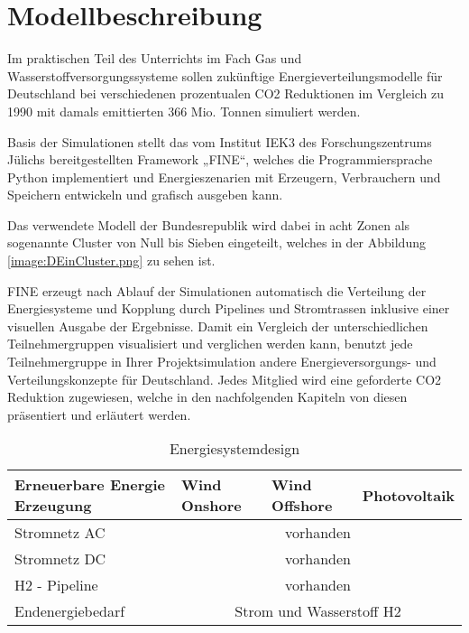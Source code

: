 \section{Modellbeschreibung}

Im praktischen Teil des Unterrichts im Fach Gas und Wasserstoffversorgungssysteme sollen zukünftige Energieverteilungsmodelle für Deutschland bei verschiedenen prozentualen CO2 Reduktionen im Vergleich zu 1990 mit damals emittierten 366 Mio. Tonnen simuliert werden. 

Basis der Simulationen stellt das vom Institut IEK3 des Forschungszentrums Jülichs bereitgestellten Framework „FINE“, welches die Programmiersprache Python implementiert und Energieszenarien mit Erzeugern, Verbrauchern und Speichern entwickeln und grafisch ausgeben kann.

Das verwendete Modell der Bundesrepublik wird dabei in acht Zonen als sogenannte Cluster von Null bis Sieben eingeteilt, welches in der Abbildung \ref{image:DEinCluster.png} zu sehen ist.


FINE erzeugt nach Ablauf der Simulationen automatisch die Verteilung der Energiesysteme und Kopplung durch Pipelines und Stromtrassen inklusive einer visuellen Ausgabe der Ergebnisse.
Damit ein Vergleich der unterschiedlichen Teilnehmergruppen visualisiert und verglichen werden kann, benutzt jede Teilnehmergruppe in Ihrer Projektsimulation andere Energieversorgungs- und Verteilungskonzepte für Deutschland. Jedes Mitglied wird eine geforderte CO2 Reduktion zugewiesen, welche in den nachfolgenden Kapiteln von diesen präsentiert und erläutert werden.%


\begin{table}[]
    \begin{tabular}{|lcll|}
        \hline
        \multicolumn{1}{|l|}{Erneuerbare Energie Erzeugung} & \multicolumn{1}{l|}{Wind Onshore} & \multicolumn{1}{l|}{Wind Offshore} & Photovoltaik \\ \hline
        \multicolumn{1}{|l|}{Stromnetz AC}     & \multicolumn{3}{c|}{vorhanden}                \\ \hline
        \multicolumn{1}{|l|}{Stromnetz DC}     & \multicolumn{3}{c|}{vorhanden}                \\ \hline
        \multicolumn{1}{|l|}{H2 - Pipeline}    & \multicolumn{3}{c|}{vorhanden}                \\ \hline
        \multicolumn{1}{|l|}{Endenergiebedarf} & \multicolumn{3}{c|}{Strom und Wasserstoff H2} \\ \hline
    \end{tabular}
    \caption{Energiesystemdesign}
    \label{tab:systemdesign}
\end{table}


